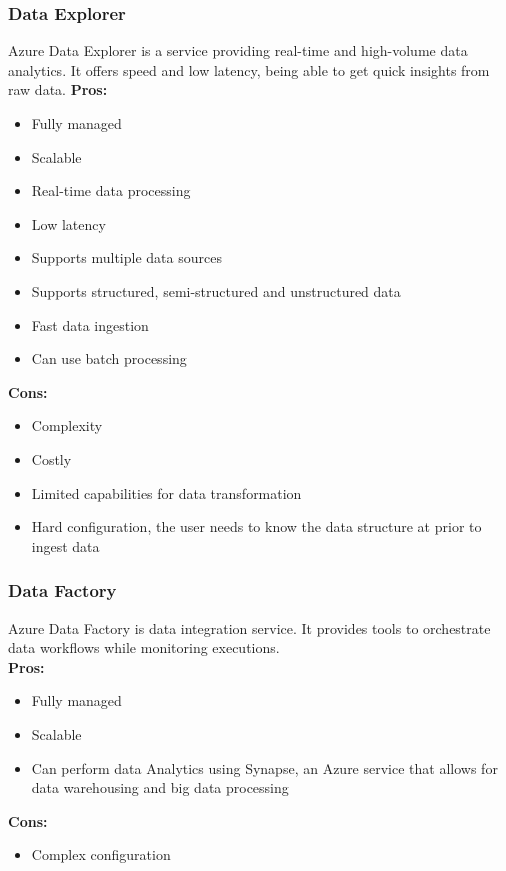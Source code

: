         \subsubsection{Data Explorer}
        \label{azure:data-explorer}
 Azure Data Explorer is a service providing real-time and high-volume data analytics. 
 It offers speed and low latency, being able to get quick insights from raw data.
        \textbf{Pros:}
        \begin{itemize}
            \item Fully managed
            \item Scalable
            \item Real-time data processing
            \item Low latency
            \item Supports multiple data sources
            \item Supports structured, semi-structured and unstructured data
            \item Fast data ingestion
            \item Can use batch processing
        \end{itemize}
        \textbf{Cons:}
        \begin{itemize}
            \item Complexity
            \item Costly
            \item Limited capabilities for data transformation
            \item Hard configuration, the user needs to know the data structure at prior to ingest data 
        \end{itemize}

        \subsubsection{Data Factory}
        \label{azure:data-factory}
 Azure Data Factory is data integration service.
 It provides tools to orchestrate data workflows while monitoring executions.\\
        \textbf{Pros:}
        \begin{itemize}
            \item Fully managed
            \item Scalable
            \item Can perform data Analytics using Synapse, an Azure service that allows for data warehousing and big data processing
        \end{itemize}
        \textbf{Cons:}
        \begin{itemize}
            \item Complex configuration
        \end{itemize}

